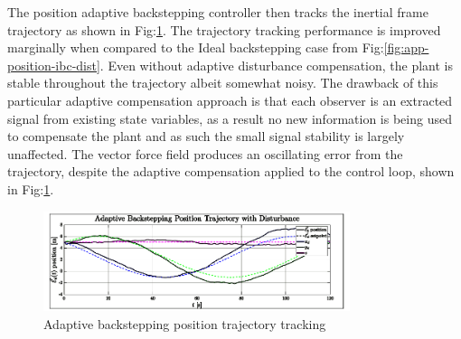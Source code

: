 The position adaptive backstepping controller then tracks the inertial frame trajectory as shown in Fig:\ref{fig:ABC_Position_Trajectory}. The trajectory tracking performance is improved marginally when compared to the Ideal backstepping case from Fig:\ref{fig:app-position-ibc-dist}. Even without adaptive disturbance compensation, the plant is stable throughout the trajectory albeit somewhat noisy. The drawback of this particular adaptive compensation approach is that each observer is an extracted signal from existing state variables, as a result no new information is being used to compensate the plant and as such the small signal stability is largely unaffected. The vector force field produces an oscillating error from the trajectory, despite the adaptive compensation applied to the control loop, shown in Fig:\ref{fig:ABC_Position_Trajectory}.
\begin{figure}[hbtp]
\vspace{-6pt}
\centering
\includegraphics[width=0.8\textwidth]{graphs/ABC_Position_Trajectory}
\vspace{-12pt}
\caption{Adaptive backstepping position trajectory tracking}
\label{fig:ABC_Position_Trajectory}
\vspace{-16pt}
\end{figure}
